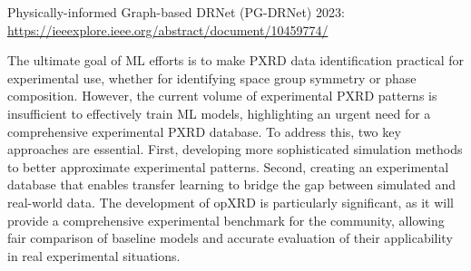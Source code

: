 Physically-informed Graph-based DRNet (PG-DRNet) 2023: \url{https://ieeexplore.ieee.org/abstract/document/10459774/}



The ultimate goal of ML efforts is to make PXRD data identification practical for experimental use, whether for identifying space group symmetry or phase composition. However, the current volume of experimental PXRD patterns is insufficient to effectively train ML models, highlighting an urgent need for a comprehensive experimental PXRD database. To address this, two key approaches are essential. First, developing more sophisticated simulation methods to better approximate experimental patterns\cite{cao2024simxrd}. Second, creating an experimental database that enables transfer learning to bridge the gap between simulated and real-world data. The development of opXRD is particularly significant, as it will provide a comprehensive experimental benchmark for the community, allowing fair comparison of baseline models and accurate evaluation of their applicability in real experimental situations.